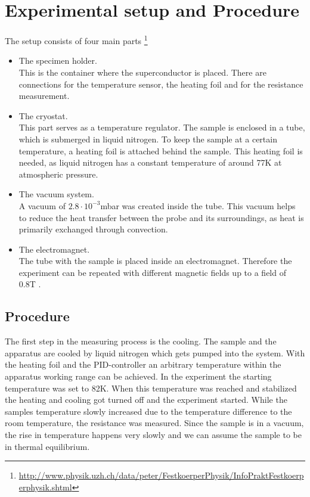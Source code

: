 \documentclass[a4paper,parskip,11pt, DIV12]{scrreprt}
\begin{document}
\chapter{Experimental setup and Procedure}

The setup consists of four main parts \footnote{\url{http://www.physik.uzh.ch/data/peter/FestkoerperPhysik/InfoPraktFestkoerperphysik.shtml}}\\
\begin{itemize}
\item The specimen holder.\\
This is the container where the superconductor is placed. There are connections for the temperature sensor, the heating foil and for the resistance measurement.\\
\item The cryostat.\\
This part serves as a temperature regulator. The sample is enclosed in a tube, which is submerged in liquid nitrogen. To keep the sample at a certain temperature, a heating foil is attached behind the sample. This heating foil is needed, as liquid nitrogen has a constant temperature of around 77K at atmospheric pressure. \\
\item The vacuum system.\\
A vacuum of $2.8 \cdot 10^{-3}$mbar was created inside the tube. This vacuum helps to reduce the heat transfer between the probe and its surroundings, as heat is primarily exchanged through convection.\\ 
\item The electromagnet.\\
The tube with the sample is placed inside an electromagnet. Therefore the experiment can be repeated with different magnetic fields up to a field of 0.8T . 

\end{itemize}
\clearpage

\section*{Procedure}

The first step in the measuring process is the cooling. The sample and the apparatus are cooled by liquid nitrogen which gets pumped into the system. With the heating foil and the PID-controller an arbitrary temperature within the apparatus working range can be achieved. In the experiment the starting temperature was set to 82K. When this temperature was reached and stabilized the heating and cooling got turned off and the experiment started. While the samples temperature slowly increased due to the temperature difference to the room temperature, the resistance was measured. 
Since the sample is in a vacuum, the rise in temperature happens very slowly and we can assume the sample to be in thermal equilibrium. 
\end{document}
